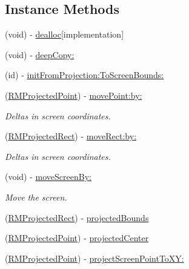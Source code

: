 \subsection*{Instance Methods}
\begin{DoxyCompactItemize}
\item 
(void) -\/ \hyperlink{interface_r_m_mercator_to_screen_projection_a10a96f474830fac6431f2b5521187397}{dealloc}{\ttfamily  \mbox{[}implementation\mbox{]}}
\item 
(void) -\/ \hyperlink{interface_r_m_mercator_to_screen_projection_a6c4a7f6af88955ab4123a4f5bc14f935}{deep\-Copy\-:}
\item 
(id) -\/ \hyperlink{interface_r_m_mercator_to_screen_projection_a6e3bab2a43cbc3c17295f63d34f7df10}{init\-From\-Projection\-:\-To\-Screen\-Bounds\-:}
\item 
(\hyperlink{struct_r_m_projected_point}{R\-M\-Projected\-Point}) -\/ \hyperlink{interface_r_m_mercator_to_screen_projection_af1262b51fc47cc2f4a4424e6e5fcfc79}{move\-Point\-:by\-:}
\begin{DoxyCompactList}\small\item\em Deltas in screen coordinates. \end{DoxyCompactList}\item 
(\hyperlink{struct_r_m_projected_rect}{R\-M\-Projected\-Rect}) -\/ \hyperlink{interface_r_m_mercator_to_screen_projection_a43f1802cb7c5c9d3bb518ee32fc5d8b5}{move\-Rect\-:by\-:}
\begin{DoxyCompactList}\small\item\em Deltas in screen coordinates. \end{DoxyCompactList}\item 
(void) -\/ \hyperlink{interface_r_m_mercator_to_screen_projection_a47cfe6fc7b295e1eacad2fea309b1840}{move\-Screen\-By\-:}
\begin{DoxyCompactList}\small\item\em Move the screen. \end{DoxyCompactList}\item 
(\hyperlink{struct_r_m_projected_rect}{R\-M\-Projected\-Rect}) -\/ \hyperlink{interface_r_m_mercator_to_screen_projection_adc63aa7ec95b73a89d4839d6851a0030}{projected\-Bounds}
\item 
(\hyperlink{struct_r_m_projected_point}{R\-M\-Projected\-Point}) -\/ \hyperlink{interface_r_m_mercator_to_screen_projection_a0be470e222397c01d1fbc343c958c4ed}{projected\-Center}
\item 
(\hyperlink{struct_r_m_projected_point}{R\-M\-Projected\-Point}) -\/ \hyperlink{interface_r_m_mercator_to_screen_projection_a079490067b3f7dd5326389720f383049}{project\-Screen\-Point\-To\-X\-Y\-:}

\end{DoxyCompactItemize}
